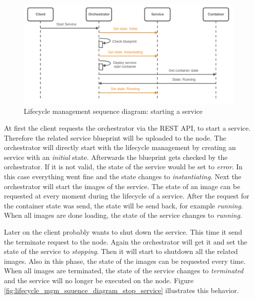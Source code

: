 \begin{figure}[H]
    \centering
    \includegraphics[width=\textwidth]{resources/images/lifecycle_sequence_diagram_start_service.png}
    \caption[Lifecycle management sequence diagram: starting a service]{Lifecycle management sequence diagram: starting a service}
    \label{fig:lifecycle_mgm_squence_diagram_start_service}
\end{figure}

At first the client requests the orchestrator via the \ac{REST} \ac{API}, to start a service.
Therefore the related service blueprint will be uploaded to the node.
The orchestrator will directly start with the lifecycle management by creating an service with an \textit{initial} state.
Afterwards the blueprint gets checked by the orchestrator.
If it is not valid, the state of the service would be set to \textit{error}.
In this case everything went fine and the state changes to \textit{instantiating}.
Next the orchestrator will start the images of the service.
The state of an image can be requested at every moment during the lifecycle of a service.
After the request for the container state was send, the state will be send back, for example \textit{running}.
When all images are done loading, the state of the service changes to \textit{running}.

Later on the client probably wants to shut down the service.
This time it send the terminate request to the node.
Again the orchestrator will get it and set the state of the service to \textit{stopping}.
Then it will start to shutdown all the related images.
Also in this phase, the state of the images can be requested every time.
When all images are terminated, the state of the service changes to \textit{terminated} and the service will no longer be executed on the node.
Figure \ref{fig:lifecycle_mgm_squence_diagram_stop_service} illustrates this behavior.

